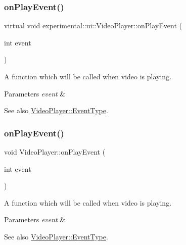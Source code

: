 \subsubsection{\texorpdfstring{on\+Play\+Event()}{onPlayEvent()}\hspace{0.1cm}{\footnotesize\ttfamily [1/2]}}
{\footnotesize\ttfamily virtual void experimental\+::ui\+::\+Video\+Player\+::on\+Play\+Event (\begin{DoxyParamCaption}\item[{int}]{event }\end{DoxyParamCaption})\hspace{0.3cm}{\ttfamily [virtual]}}



A function which will be called when video is playing. 


\begin{DoxyParams}{Parameters}
{\em event} & \\
\hline
\end{DoxyParams}
\begin{DoxySeeAlso}{See also}
\hyperlink{classexperimental_1_1ui_1_1VideoPlayer_a29899b427d61c030036fda6c5ddcb10a}{Video\+Player\+::\+Event\+Type}. 
\end{DoxySeeAlso}
\mbox{\label{classexperimental_1_1ui_1_1VideoPlayer_a76314bbf716a9b8685257c70fce7115f}} 
\subsubsection{\texorpdfstring{on\+Play\+Event()}{onPlayEvent()}\hspace{0.1cm}{\footnotesize\ttfamily [2/2]}}
{\footnotesize\ttfamily void Video\+Player\+::on\+Play\+Event (\begin{DoxyParamCaption}\item[{int}]{event }\end{DoxyParamCaption})\hspace{0.3cm}{\ttfamily [virtual]}}



A function which will be called when video is playing. 


\begin{DoxyParams}{Parameters}
{\em event} & \\
\hline
\end{DoxyParams}
\begin{DoxySeeAlso}{See also}
\hyperlink{classexperimental_1_1ui_1_1VideoPlayer_a29899b427d61c030036fda6c5ddcb10a}{Video\+Player\+::\+Event\+Type}. 
\end{DoxySeeAlso}
\mbox{\label{classexperimental_1_1ui_1_1VideoPlayer_a420bb0e3cdf1e34d257f1a9f0cb25436}} 

